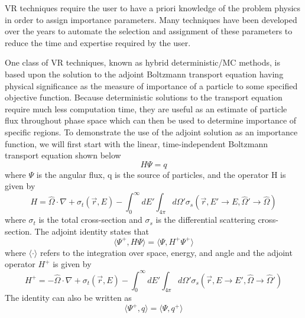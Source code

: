 VR techniques require the user to have a priori knowledge of the problem physics
in order to assign importance parameters.
Many techniques have been developed over the years to automate the selection and
assignment of these parameters to reduce the time and expertise required by
the user.

One class of VR techniques, known as hybrid deterministic/MC methods,
is based upon
the solution to the adjoint Boltzmann transport equation having physical
significance as the measure of importance of a particle to some specified
objective function.  
Because deterministic solutions to the transport equation %
require much less computation time, they are useful as an estimate of
particle flux throughout phase space which can then be used to determine
importance of specific regions.
To demonstrate the use of the adjoint solution as an importance function,
we will first start with the linear, time-independent Boltzmann transport
equation shown below
\begin{equation} \label{eq:3.1a}
  H\Psi = q
\end{equation}
where $\Psi$ is the angular flux, q is the source of particles, and the operator H
is given by
\begin{equation} \label{eq:3.1b}
		H = \widehat{\Omega} \cdot \nabla +
		    \sigma_{t}(\overrightarrow{r},E) - 
			\int_{0}^{\infty} dE'
			\int_{4\pi} d\Omega'
			\sigma_{s}( \overrightarrow{r}, E' 
			\rightarrow E, \widehat{\Omega}' 
			\rightarrow \widehat{\Omega} )
\end{equation}
where $\sigma_{t}$ is the total cross-section and $\sigma_{s}$ is the
differential scattering cross-section.
The adjoint identity states that
\begin{equation} \label{eq:3.2}
		\langle \Psi^{+} , H\Psi \rangle =
		\langle \Psi, H^{+}\Psi^{+} \rangle
\end{equation}
where $ \langle \cdot \rangle$ refers to the integration over space,
energy, and angle and the adjoint operator $H^{+}$ is given by
\begin{equation} \label{eq:3.2b}
		H^{+} = -\widehat{\Omega} \cdot \nabla +
		    \sigma_{t}(\overrightarrow{r},E) - 
			\int_{0}^{\infty} dE'
			\int_{4\pi} d\Omega'
			\sigma_{s}( \overrightarrow{r}, E 
			\rightarrow E', \widehat{\Omega} 
			\rightarrow \widehat{\Omega}' )
\end{equation}
The identity can also be written as
\begin{equation} \label{eq:3.2b}
		\langle \Psi^{+} , q \rangle =
		\langle \Psi, q^{+} \rangle
\end{equation}
